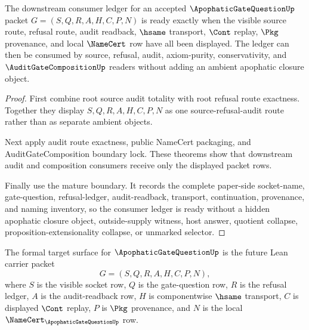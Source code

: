 \begin{theorem}
\label{thm:apophatic-gate-question-root-consumer-ledger-readiness}
The downstream consumer ledger for an accepted $\ApophaticGateQuestionUp$ packet $G=(S,Q,R,A,H,C,P,N)$ is ready exactly when the visible source route, refusal route, audit readback, $\hsame$ transport, $\Cont$ replay, $\Pkg$ provenance, and local $\NameCert$ row have all been displayed. The ledger can then be consumed by source, refusal, audit, axiom-purity, conservativity, and $\AuditGateCompositionUp$ readers without adding an ambient apophatic closure object.
\end{theorem}
\begin{proof}
First combine root source audit totality with root refusal route exactness. Together they display $S,Q,R,A,H,C,P,N$ as one source-refusal-audit route rather than as separate ambient objects.

Next apply audit route exactness, public NameCert packaging, and AuditGateComposition boundary lock. These theorems show that downstream audit and composition consumers receive only the displayed packet rows.

Finally use the mature boundary. It records the complete paper-side socket-name, gate-question, refusal-ledger, audit-readback, transport, continuation, provenance, and naming inventory, so the consumer ledger is ready without a hidden apophatic closure object, outside-supply witness, host answer, quotient collapse, proposition-extensionality collapse, or unmarked selector.
\end{proof}

\begin{definition}
\label{def:apophatic-gate-question-formal-target}
The formal target surface for $\ApophaticGateQuestionUp$ is the future Lean carrier packet
$$
G=(S,Q,R,A,H,C,P,N),
$$
where $S$ is the visible socket row, $Q$ is the gate-question row, $R$ is the refusal ledger, $A$ is the audit-readback row, $H$ is componentwise $\hsame$ transport, $C$ is displayed $\Cont$ replay, $P$ is $\Pkg$ provenance, and $N$ is the local $\NameCert_{\ApophaticGateQuestionUp}$ row.
\end{definition}

